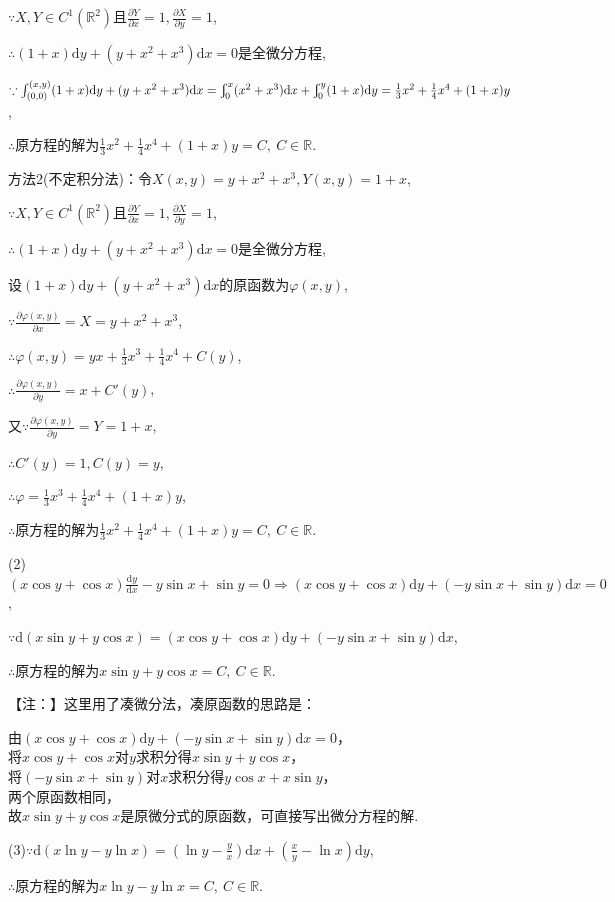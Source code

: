 \documentclass[12pt,UTF8]{ctexart}
\newcommand{\Int}[4]{\varint\nolimits_{#1}^{#2}#3\mathrm d#4}
\newcommand{\md}[1]{\mathrm d#1}
\newcommand{\ppx}[1]{\frac{\partial #1}{\partial x}}
\newcommand{\ppy}[1]{\frac{\partial #1}{\partial y}}
\begin{document}
\begin{enumerate}
$\because X,Y\in C^1(\mathbb R^2)$且$\ppx{Y}=1,\ppy{X}=1$,

$\therefore(1+x)\md y+(y+x^2+x^3)\md x=0$是全微分方程,

$\because\int_{(0,0)}^{(x,y)}(1+x)\md y+(y+x^2+x^3)\md x=\Int0x{(x^2+x^3)}x+\Int0y{(1+x)}y=\frac13x^2+\frac14x^4+(1+x)y$,

$\therefore$原方程的解为$\frac13x^2+\frac14x^4+(1+x)y=C,\ C\in\mathbb R$.

方法2(不定积分法)：令$X(x,y)=y+x^2+x^3,Y(x,y)=1+x$,

$\because X,Y\in C^1(\mathbb R^2)$且$\ppx{Y}=1,\ppy{X}=1$,

$\therefore(1+x)\md y+(y+x^2+x^3)\md x=0$是全微分方程,

设$(1+x)\md y+(y+x^2+x^3)\md x$的原函数为$\varphi(x,y)$,

$\because\ppx{\varphi(x,y)}=X=y+x^2+x^3$,

$\therefore\varphi(x,y)=yx+\frac13x^3+\frac14x^4+C(y)$,

$\therefore\ppy{\varphi(x,y)}=x+C'(y)$,

又$\because\ppy{\varphi(x,y)}=Y=1+x$,

$\therefore C'(y)=1,C(y)=y$,

$\therefore\varphi=\frac13x^3+\frac14x^4+(1+x)y$,

$\therefore$原方程的解为$\frac13x^2+\frac14x^4+(1+x)y=C,\ C\in\mathbb R$.

(2)$(x\cos y+\cos x)\frac{\md y}{\md x}-y\sin x+\sin y=0\Rightarrow(x\cos y+\cos x)\md y+(-y\sin x+\sin y)\md x=0$,

$\because\md(x\sin y+y\cos x)=(x\cos y+\cos x)\md y+(-y\sin x+\sin y)\md x$,

$\therefore$原方程的解为$x\sin y+y\cos x=C,\ C\in\mathbb R$.

【注：】这里用了凑微分法，凑原函数的思路是：

由$(x\cos y+\cos x)\md y+(-y\sin x+\sin y)\md x=0$，\\将$x\cos y+\cos x$对$y$求积分得$x\sin y+y\cos x$，\\将$(-y\sin x+\sin y)$对$x$求积分得$y\cos x+x\sin y$，\\两个原函数相同，\\故$x\sin y+y\cos x$是原微分式的原函数，可直接写出微分方程的解.

(3)$\because\md(x\ln y-y\ln x)=(\ln y-\frac yx)\md x+(\frac xy-\ln x)\md y$,

$\therefore$原方程的解为$x\ln y-y\ln x=C,\ C\in\mathbb R$.


\end{enumerate}
\end{document}
